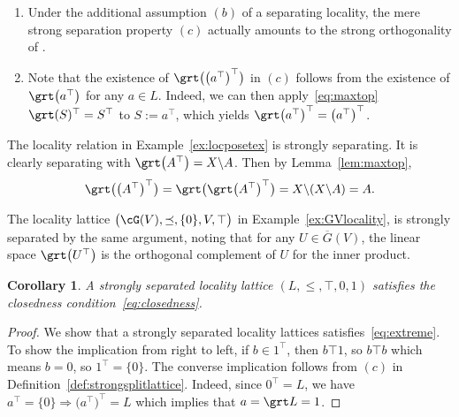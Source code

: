 \documentclass[pdftex]{sigma}
\numberwithin{equation}{section}
\newtheorem{Corollary}[Theorem]{Corollary}
\newcommand{\loc}{locality\xspace}
\newcommand{\pone}{separating\xspace }
\def \ptwob {separated\xspace }
\begin{document}
 \begin{Remark}\qquad
 \begin{enumerate}\itemsep=0pt
 		\item[$(a)$] Under the additional assumption $(b)$ of a separating locality, the mere strong separation property $(c)$ actually amounts to the strong orthogonality of \cite[Definition~2.3]{CM}.
 		\item[$(b)$] Note that the existence of $\grt\big(\big(a^\top\big)^\top\big)$ in $(c)$ follows from the existence of $\grt\big(a^\top\big)$ for any $a\in L$. Indeed, we can then apply~\eqref{eq:maxtop} $\grt(S)^{\top}=S^{\top}$ to $S:=a^\top$, which yields $\grt\big(a^\top\big)^\top= \big(a^\top\big)^\top$.
 \end{enumerate}
 \end{Remark}

\begin{Example}
	The \loc relation in Example~\ref{ex:locposetex} is strongly \pone. It is clearly \pone with $\grt\big(A^\top\big)=X\backslash A$.
	Then by Lemma~\ref{lem:maxtop},
	\begin{gather*}
\grt \big(\big(A^\top\big)^\top\big)=\grt\big( \grt\big(A^\top\big)^\top\big)=X\backslash (X\backslash A)=A.
\end{gather*}
\end{Example}
\begin{Example}
The \loc lattice $\big(\cG(V), \preceq, \{0\}, V, \top \big)$ in Example~\ref{ex:GVlocality}, is strongly \ptwob by the same argument, noting that for any $U\in \overline G(V)$, the linear space $\grt\big(U^\top\big)$ is the orthogonal complement of $U$ for the inner product.
\end {Example}
	

\begin{Corollary} %
A strongly separated locality lattice $(L, \leq,\top,0,1)$ satisfies the closedness condition~\eqref{eq:closedness}.
\end{Corollary}
\begin{proof} We show that a strongly separated locality lattices satisfies~\eqref{eq:extreme}.
To show the implication from right to left, if $b\in 1^\top$, then $b\top 1$, so $b\top b$ which means $b=0$, so $1^\top =\{0\}$. The converse implication follows from $(c)$ in Definition~\ref{def:strongsplitlattice}. Indeed, since $0^\top=L$, we have $a^\top=\{0\}\Rightarrow \big(a^\top\big)^\top=L$ which implies that $a=\grt L=1$.
\end{proof}
\end{document}

